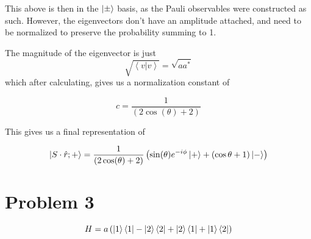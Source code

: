 \documentclass[]{article}
\begin{document}
This above is then in the \(\ket{\pm}\) basis, as the Pauli observables
were constructed as such. However, the eigenvectors don't have an
amplitude attached, and need to be normalized to preserve the
probability summing to 1.

The magnitude of the eigenvector is just \[
\sqrt{\left<v|v\right>  } = \sqrt{ aa^{*} }
\] which after calculating, gives us a normalization constant of

\[
c=\frac{1}{\left( 2\cos (\theta)+2 \right) }
\]

This gives us a final representation of

\[
\ket{S\cdot \hat{r};+} =\frac{1}{\left( 2\cos (\theta)+2 \right) }\left( \sin(\theta)e^{ -i\phi }\ket{+} +(\cos \theta+1)\ket{-}  \right) 
\]

\hypertarget{problem-3}{%
\section{Problem 3}\label{problem-3}}

\[
H = a\left(\ket{1}\bra{1} -\ket{2}\bra{2}+\ket{2}\bra{1}+\ket{1}\bra{2}  \right) 
\]
\end{document}
